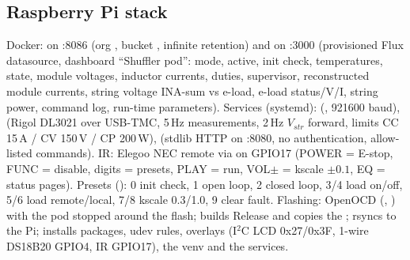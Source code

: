 \subsection{Raspberry Pi stack}
{\sloppy Docker:  on :8086 (org , bucket , infinite retention) and  on :3000 (provisioned Flux datasource, dashboard ``Shuffler pod'': mode, active, init check, temperatures, state, module voltages, inductor currents, duties, supervisor, reconstructed module currents, string voltage INA-sum vs e-load, e-load status/V/I, string power, command log, run-time parameters). Services (systemd):  (, 921600 baud),  (Rigol DL3021 over USB-TMC, 5\,Hz measurements, 2\,Hz $V_{str}$ forward, limits CC 15\,A / CV 150\,V / CP 200\,W),  (stdlib HTTP on :8080, no authentication, allow-listed commands). IR: Elegoo NEC remote via  on GPIO17 (POWER = E-stop, FUNC = disable, digits = presets, PLAY = run, VOL$\pm$ = kscale $\pm0.1$, EQ = status pages). Presets (): 0 init check, 1 open loop, 2 closed loop, 3/4 load on/off, 5/6 load remote/local, 7/8 kscale 0.3/1.0, 9 clear fault. Flashing: OpenOCD (, ) with the pod stopped around the flash;  builds Release and copies the ;  rsyncs  to the Pi;  installs packages, udev rules, overlays (I$^2$C LCD 0x27/0x3F, 1-wire DS18B20 GPIO4, IR GPIO17), the venv and the services.\par}
